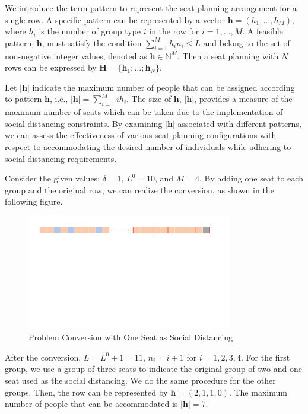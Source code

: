 We introduce the term pattern to represent the seat planning arrangement for a single row. A specific pattern can be represented by a vector $\bm{h} = (h_1, \ldots, h_M)$, where $h_i$ is the number of group type $i$ in the row for $i = 1,\ldots, M$. A feasible pattern, $\bm{h}$, must satisfy the condition $\sum_{i=1}^{M} h_i n_i \leq L$ and belong to the set of non-negative integer values, denoted as $\bm{h} \in \mathbb{N}^{M}$. Then a seat planning with $N$ rows can be expressed by $\bm{H} = \{\bm{h}_1; \ldots; \bm{h}_N\}$.
  
Let $|\bm{h}|$ indicate the maximum number of people that can be assigned according to pattern $\bm{h}$, i.e., $|\bm{h}| = \sum_{i =1}^{M} i h_i$. The size of $\bm{h}$, $|\bm{h}|$, provides a measure of the maximum number of seats which can be taken due to the implementation of social distancing constraints. By examining $|\bm{h}|$ associated with different patterns, we can assess the effectiveness of various seat planning configurations with respect to accommodating the desired number of individuals while adhering to social distancing requirements.

\begin{example}
Consider the given values: $\delta = 1$, $L^{0} = 10$, and $M = 4$. By adding one seat to each group and the original row, we can realize the conversion, as shown in the following figure.

\begin{figure}[ht]
    \centering
        \includegraphics[width=0.8\textwidth]{./Figures/dummy_seat.pdf}
    \caption{Problem Conversion with One Seat as Social Distancing}
\end{figure}

After the conversion, $L = L^{0} + 1 =11$, $n_i = i + 1$ for $i = 1, 2, 3, 4$. For the first group, we use a group of three seats to indicate the original group of two and one seat used as the social distancing. We do the same procedure for the other groups. Then, the row can be represented by $\bm{h} = (2,1,1,0)$. The maximum number of people that can be accommodated is $|\bm{h}| = 7$.
\end{example}


